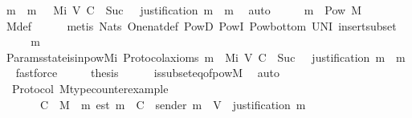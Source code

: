 \begin{isabellebody}
\ m{\isacharprime}\ \ {\isachardoublequoteopen}m{\isacharprime}\ {\isasymin}\ \ Mi\ {\isacharparenleft}V{\isacharcomma}\ C{\isacharcomma}\ {\isasymepsilon}{\isacharparenright}\ {\isacharparenleft}Suc\ {}{\isacharparenright}\ {\isasymand}\ justification\ m{\isacharprime}\ {\isacharequal}\ {\isacharbraceleft}m{\isacharbraceright}{\isachardoublequoteclose}\ \isamarkupfalse%
\ auto\isanewline
\ \ \isamarkupfalse%
\ \isamarkupfalse%
\ {\isachardoublequoteopen}{\isacharbraceleft}m{\isacharprime}{\isacharbraceright}\ {\isasymin}\ Pow\ M{\isachardoublequoteclose}\ \isanewline
\ \ \ \ \isamarkupfalse%
\ M{\isacharunderscore}def\isanewline
\ \ \ \ \isamarkupfalse%
\ {\isacharparenleft}metis\ Nats{\isacharunderscore}{}\ One{\isacharunderscore}nat{\isacharunderscore}def\ PowD\ PowI\ Pow{\isacharunderscore}bottom\ UN{\isacharunderscore}I\ insert{\isacharunderscore}subset{\isacharparenright}\isanewline
\ \ \isamarkupfalse%
\ \isamarkupfalse%
\ {\isachardoublequoteopen}{\isacharbraceleft}m{\isacharprime}{\isacharbraceright}\ {\isasymnotin}\ {\isasymSigma}{\isachardoublequoteclose}\isanewline
\ \ \ \ \isamarkupfalse%
\ Params{\isachardot}state{\isacharunderscore}is{\isacharunderscore}in{\isacharunderscore}pow{\isacharunderscore}Mi\ Protocol{\isacharunderscore}axioms\ {\isacartoucheopen}m{\isacharprime}\ {\isasymin}\ Mi\ {\isacharparenleft}V{\isacharcomma}\ C{\isacharcomma}\ {\isasymepsilon}{\isacharparenright}\ {\isacharparenleft}Suc\ {}{\isacharparenright}\ {\isasymand}\ justification\ m{\isacharprime}\ {\isacharequal}\ {\isacharbraceleft}m{\isacharbraceright}{\isacartoucheclose}\ \isamarkupfalse%
\ fastforce\isanewline
\ \ \isamarkupfalse%
\ \isamarkupfalse%
\ {\isacharquery}thesis\isanewline
\ \ \ \ \isamarkupfalse%
\ {\isasymSigma}is{\isacharunderscore}subseteq{\isacharunderscore}of{\isacharunderscore}pow{\isacharunderscore}M\ \isamarkupfalse%
\ auto\isanewline
{}\isamarkupfalse%
%
\endisatagproof
{\isafoldproof}%
%
\isadelimproof
\isanewline
%
\endisadelimproof
\isanewline
\isanewline
{}\isamarkupfalse%
\ {\isacharparenleft}\ Protocol{\isacharparenright}\ M{\isacharunderscore}type{\isacharunderscore}counterexample{\isacharcolon}\ \isanewline
\ \ {\isachardoublequoteopen}{\isacharparenleft}{\isasymforall}\ {\isasymsigma}{\isachardot}\ {\isasymepsilon}\ {\isasymsigma}\ {\isacharequal}\ C{\isacharparenright}\ {\isasymLongrightarrow}\ M\ {\isacharequal}\ {\isacharbraceleft}m{\isachardot}\ est\ m\ {\isasymin}\ C\ {\isasymand}\ sender\ m\ {\isasymin}\ V\ {\isasymand}\ justification\ m\ {\isasymin}\ {\isasymSigma}{\isacharbraceright}{\isachardoublequoteclose}\isanewline

\end{isabellebody}

